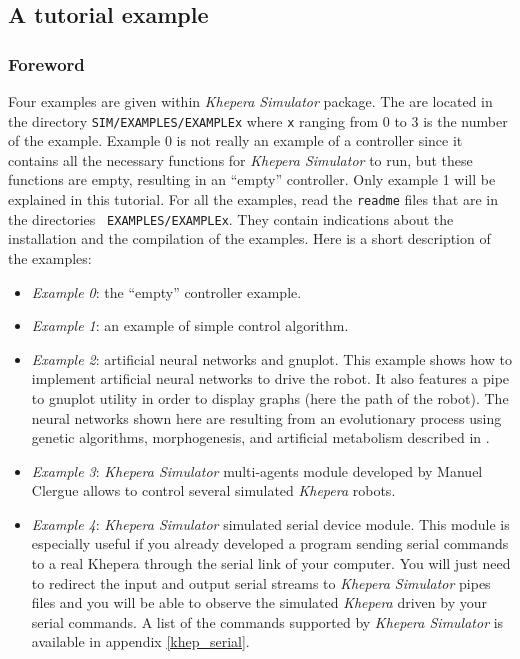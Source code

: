 \documentclass[a4paper,twoside]{article}
\begin{document}
\subsection{A tutorial example}

\subsubsection{Foreword}

Four examples are given within {\em Khepera Simulator} package. The are
located in the directory {\tt SIM/EXAMPLES/EXAMPLEx} where {\tt x} ranging from
0 to 3 is the number of the example. Example 0 is not really an example of a
controller since it contains all the necessary functions for {\em Khepera
Simulator} to run, but these functions are empty, resulting in an ``empty''
controller. Only example 1 will be explained in this tutorial. For all the
examples, read the {\tt readme} files that are in the directories {\tt
EXAMPLES/EXAMPLEx}. They contain indications about the installation and the
compilation of the examples. Here is a short description of the examples:

\begin{itemize}

\item {\em Example 0}: the ``empty'' controller example.

\item {\em Example 1}: an example of simple control algorithm.

\item {\em Example 2}: artificial neural networks and gnuplot. This example
shows how to implement artificial neural networks to drive the robot. It also
features a pipe to gnuplot utility in order to display graphs (here the path
of the robot). The neural networks shown here are resulting from an
evolutionary process using genetic algorithms, morphogenesis, and artificial
metabolism described in \cite{MICHEL95}.

\item {\em Example 3}: {\em Khepera Simulator} multi-agents module developed
by Manuel Clergue allows to control several simulated {\em Khepera} robots.

\item {\em Example 4}: {\em Khepera Simulator} simulated serial device
module. This module is especially useful if you already developed a program
sending serial commands to a real Khepera through the serial link of your
computer. You will just need to redirect the input and output serial streams to
{\em Khepera Simulator} pipes files and you will be able to observe the
simulated {\em Khepera} driven by your serial commands. A list of the commands
supported by {\em Khepera Simulator} is available in appendix
\ref{khep_serial}.

\end{itemize}
\end{document}
